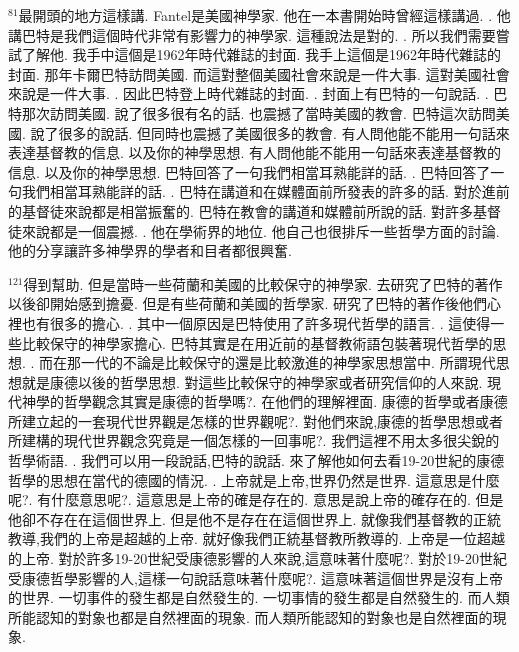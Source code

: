 \documentclass{book}
\begin{document}
$^{81}$最開頭的地方這樣講.
Fantel是美國神學家.
他在一本書開始時曾經這樣講過.
.
他講巴特是我們這個時代非常有影響力的神學家.
這種說法是對的.
.
所以我們需要嘗試了解他.
我手中這個是1962年時代雜誌的封面.
我手上這個是1962年時代雜誌的封面.
那年卡爾巴特訪問美國.
而這對整個美國社會來說是一件大事.
這對美國社會來說是一件大事.
.
因此巴特登上時代雜誌的封面.
.
封面上有巴特的一句說話.
.
巴特那次訪問美國.
說了很多很有名的話.
也震撼了當時美國的教會.
巴特這次訪問美國.
說了很多的說話.
但同時也震撼了美國很多的教會.
有人問他能不能用一句話來表達基督教的信息.
以及你的神學思想.
有人問他能不能用一句話來表達基督教的信息.
以及你的神學思想.
巴特回答了一句我們相當耳熟能詳的話.
.
巴特回答了一句我們相當耳熟能詳的話.
.
巴特在講道和在媒體面前所發表的許多的話.
對於進前的基督徒來說都是相當振奮的.
巴特在教會的講道和媒體前所說的話.
對許多基督徒來說都是一個震撼.
.
他在學術界的地位.
他自己也很排斥一些哲學方面的討論.
他的分享讓許多神學界的學者和目者都很興奮.

$^{121}$得到幫助.
但是當時一些荷蘭和美國的比較保守的神學家.
去研究了巴特的著作以後卻開始感到擔憂.
但是有些荷蘭和美國的哲學家.
研究了巴特的著作後他們心裡也有很多的擔心.
.
其中一個原因是巴特使用了許多現代哲學的語言.
.
這使得一些比較保守的神學家擔心.
巴特其實是在用近前的基督教術語包裝著現代哲學的思想.
.
而在那一代的不論是比較保守的還是比較激進的神學家思想當中.
所謂現代思想就是康德以後的哲學思想.
對這些比較保守的神學家或者研究信仰的人來說.
現代神學的哲學觀念其實是康德的哲學嗎?.
在他們的理解裡面.
康德的哲學或者康德所建立起的一套現代世界觀是怎樣的世界觀呢?.
對他們來說,康德的哲學思想或者所建構的現代世界觀念究竟是一個怎樣的一回事呢?.
我們這裡不用太多很尖銳的哲學術語.
.
我們可以用一段說話,巴特的說話.
來了解他如何去看19-20世紀的康德哲學的思想在當代的德國的情況.
.
上帝就是上帝,世界仍然是世界.
這意思是什麼呢?.
有什麼意思呢?.
這意思是上帝的確是存在的.
意思是說上帝的確存在的.
但是他卻不存在在這個世界上.
但是他不是存在在這個世界上.
就像我們基督教的正統教導,我們的上帝是超越的上帝.
就好像我們正統基督教所教導的.
上帝是一位超越的上帝.
對於許多19-20世紀受康德影響的人來說,這意味著什麼呢?.
對於19-20世紀受康德哲學影響的人,這樣一句說話意味著什麼呢?.
這意味著這個世界是沒有上帝的世界.
一切事件的發生都是自然發生的.
一切事情的發生都是自然發生的.
而人類所能認知的對象也都是自然裡面的現象.
而人類所能認知的對象也是自然裡面的現象.
\end{document}
